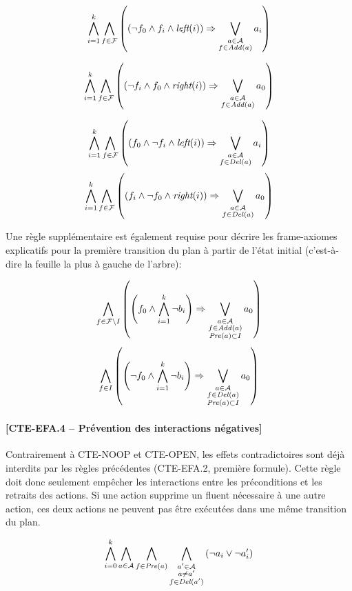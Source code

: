 \begin{small}
\[ \bigwedge\limits_{\substack{i=1}}^{k} \bigwedge\limits_{\substack{f\in \mathcal{F}}}
\left(\left(\neg f_{0} \wedge f_{i} \wedge \textit{left}(i) \right) \Rightarrow \bigvee\limits_{\substack{\substack{a \in \mathcal{A} \\ f \in \mathit{Add}(a)}}} a_{i}\right)\]

\[ \bigwedge\limits_{\substack{i=1}}^{k} \bigwedge\limits_{\substack{f\in \mathcal{F}}}
\left(\left(\neg f_{i} \wedge f_{0} \wedge \textit{right}(i) \right) \Rightarrow \bigvee\limits_{\substack{\substack{a \in \mathcal{A} \\ f \in \mathit{Add}(a)}}} a_{0}\right)\]
\end{small}

\begin{small}
\[ \bigwedge\limits_{\substack{i=1}}^{k} \bigwedge\limits_{\substack{f\in \mathcal{F}}}
\left(\left(f_{0} \wedge \neg f_{i} \wedge \textit{left}(i) \right) \Rightarrow \bigvee\limits_{\substack{\substack{a \in \mathcal{A} \\ f \in \mathit{Del}(a)}}} a_{i}\right)\]
\[ \bigwedge\limits_{\substack{i=1}}^{k} \bigwedge\limits_{\substack{f\in \mathcal{F}}}
\left(\left(f_{i} \wedge \neg f_{0} \wedge \textit{right}(i) \right) \Rightarrow \bigvee\limits_{\substack{\substack{a \in \mathcal{A} \\ f \in \mathit{Del}(a)}}} a_{0}\right)\]
\end{small}

Une règle supplémentaire est également requise pour décrire les frame-axiomes explicatifs pour la première transition du plan à partir de l'état initial (c'est-à-dire la feuille la plus à gauche de l'arbre):

\[ \bigwedge\limits_{\substack{f\in \mathcal{F}\setminus I}} \left(\left(f_{0}\wedge \bigwedge\limits_{\substack{i=1}}^{k}\neg b_{i}\right) \Rightarrow \bigvee\limits_{\substack{a\in \mathcal{A}\\ f\in\mathit{Add}(a)\\\mathit{Pre}(a) \subset I}} {a}_{0} \right) \]
\[ \bigwedge\limits_{\substack{f\in I}} \left(\left(\neg f_{0}\wedge \bigwedge\limits_{\substack{i=1}}^{k}\neg b_{i}\right) \Rightarrow \bigvee\limits_{\substack{a\in \mathcal{A}\\ f\in\mathit{Del}(a)\\\mathit{Pre}(a) \subset I}} {a}_{0} \right) \]

\paragraph*{[CTE-EFA.4 -- Prévention des interactions négatives]}

Contrairement à CTE-NOOP et CTE-OPEN, les effets contradictoires sont déjà interdits par les règles précédentes (CTE-EFA.2, première formule).
Cette règle doit donc seulement empêcher les interactions entre les préconditions et les retraits des actions. Si une action supprime un fluent nécessaire à une autre action, ces deux actions ne peuvent pas être exécutées dans une même transition du plan.

\[ \bigwedge\limits_{\substack{i=0}}^{k} \bigwedge\limits_{\substack{a \in \mathcal{A}}} \bigwedge\limits_{\substack{f\in \mathit{Pre}(a)}} \bigwedge\limits_{\substack{a' \in \mathcal{A} \\ a \neq a' \\ f \in \mathit{Del}(a')}}\left(\neg a_{i} \vee \neg a'_{i}\right) \]
